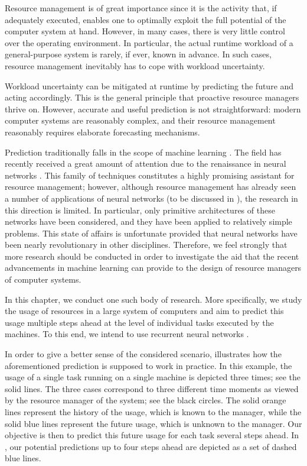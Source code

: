 Resource management is of great importance since it is the activity that, if
adequately executed, enables one to optimally exploit the full potential of the
computer system at hand. However, in many cases, there is very little control
over the operating environment. In particular, the actual runtime workload of a
general-purpose system is rarely, if ever, known in advance. In such cases,
resource management inevitably has to cope with workload uncertainty.

Workload uncertainty can be mitigated at runtime by predicting the future and
acting accordingly. This is the general principle that proactive resource
managers thrive on. However, accurate and useful prediction is not
straightforward: modern computer systems are reasonably complex, and their
resource management reasonably requires elaborate forecasting mechanisms.

Prediction traditionally falls in the scope of machine learning
\cite{hastie2013}. The field has recently received a great amount of attention
due to the renaissance in neural networks \cite{goodfellow2016}. This family of
techniques constitutes a highly promising assistant for resource management;
however, although resource management has already seen a number of applications
of neural networks (to be discussed in ), the research in this
direction is limited. In particular, only primitive architectures of these
networks have been considered, and they have been applied to relatively simple
problems. This state of affairs is unfortunate provided that neural networks
have been nearly revolutionary in other disciplines. Therefore, we feel strongly
that more research should be conducted in order to investigate the aid that the
recent advancements in machine learning can provide to the design of resource
managers of computer systems.

In this chapter, we conduct one such body of research. More specifically, we
study the usage of resources in a large system of computers and aim to predict
this usage multiple steps ahead at the level of individual tasks executed by the
machines. To this end, we intend to use recurrent neural networks
\cite{goodfellow2016}.

In order to give a better sense of the considered scenario,
 illustrates how the aforementioned prediction is
supposed to work in practice. In this example, the  usage of a single
task running on a single machine is depicted three times; see the solid lines.
The three cases correspond to three different time moments as viewed by the
resource manager of the system; see the black circles. The solid orange lines
represent the history of the  usage, which is known to the manager,
while the solid blue lines represent the future usage, which is unknown to the
manager. Our objective is then to predict this future usage for each task
several steps ahead. In , our potential predictions up
to four steps ahead are depicted as a set of dashed blue lines.

